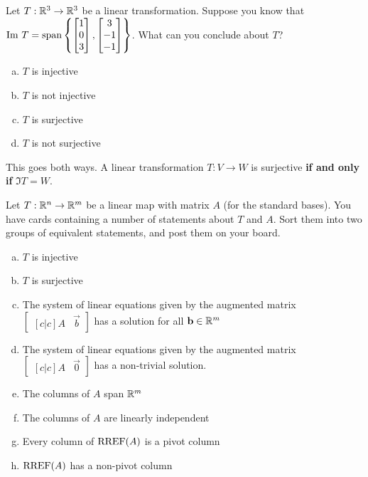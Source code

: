 \begin{applicationActivities}{3}{19}
\begin{activity}{5}
Let $T: \IR^3 \rightarrow \IR^3$ be a linear transformation.  Suppose you know that $\Im T = {\rm span} \left\{ \begin{bmatrix} 1 \\ 0 \\ 3 \end{bmatrix}, \begin{bmatrix} 3 \\ -1 \\ -1 \end{bmatrix} \right\}$.  What can you conclude about $T$?
\begin{enumerate}[(a)]
\item $T$ is injective
\item $T$ is not injective
\item $T$ is surjective
\item $T$ is not surjective
\end{enumerate}
\end{activity}

\begin{fact}
This goes both ways.  A linear transformation $T:V \rightarrow W$ is surjective {\bf if and only if} $\Im T = W$.
\end{fact}

\begin{activity}{15}
Let $T: \IR^n \rightarrow \IR^m$ be a linear map with matrix $A$ (for the standard bases).  You have cards containing a number of statements about $T$ and $A$.  Sort them into two groups of equivalent statements, and post them on your board.
\begin{multicols}{2}
\begin{enumerate}[(a)]
\item $T$ is injective
\item $T$ is surjective
\item The system of linear equations given by the augmented matrix $\begin{bmatrix}[c|c]A & \vec{b} \end{bmatrix}$ has a solution for all $\vec{b} \in \IR^m$
\item The system of linear equations given by the augmented matrix~$\begin{bmatrix}[c|c] A & \vec{0} \end{bmatrix}$ has a non-trivial solution.
\item The columns of $A$ span $\IR^m$
\item The columns of $A$ are linearly independent
\item Every column of $\RREF(A)$ is a pivot column
\item $\RREF(A)$ has a non-pivot column \\
\ \\
\ \\
\end{enumerate}
\end{multicols}



\end{activity}
\end{applicationActivities}
